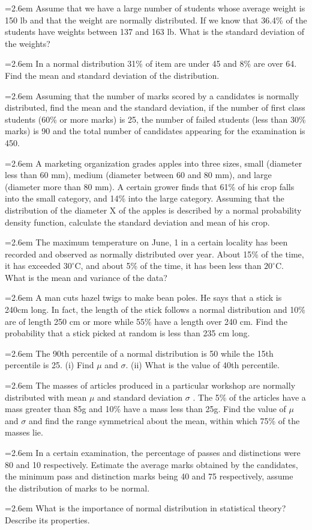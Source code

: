 \documentclass[11pt,a4paper]{article}
\newcommand{\Q}[2]{\par\smallskip\noindent\hangindent=2.6em\hangafter=1
  \makebox[2.6em][l]{\textbf{#1.}}#2\par}
\begin{document}
\Q{22}{Assume that we have a large number of students whose average weight is 150 lb and that the weight are normally distributed. If we know that 36.4\% of the students have weights between 137 and 163 lb. What is the standard deviation of the weights?}
\Q{23}{In a normal distribution 31\% of item are under 45 and 8\% are over 64. Find the mean and standard deviation of the distribution.}
\Q{24}{Assuming that the number of marks scored by a candidates is normally distributed, find the mean and the standard deviation, if the number of first class students (60\% or more marks) is 25, the number of failed students (less than 30\% marks) is 90 and the total number of candidates appearing for the examination is 450.}
\Q{25}{A marketing organization grades apples into three sizes, small (diameter less than 60 mm), medium (diameter between 60 and 80 mm), and large (diameter more than 80 mm). A certain grower finds that 61\% of his crop falls into the small category, and 14\% into the large category. Assuming that the distribution of the diameter X of the apples is described by a normal probability density function, calculate the standard deviation and mean of his crop.}
\Q{26}{The maximum temperature on June, 1 in a certain locality has been recorded and observed as normally distributed over year. About 15\% of the time, it has exceeded $30^{\circ}$C, and about 5\% of the time, it has been less than $20^{\circ}$C. What is the mean and variance of the data?}
\Q{27}{A man cuts hazel twigs to make bean poles. He says that a stick is 240cm long. In fact, the length of the stick follows a normal distribution and 10\% are of length 250 cm or more while 55\% have a length over 240 cm. Find the probability that a stick picked at random is less than 235 cm long.}
\Q{28}{The 90th percentile of a normal distribution is 50 while the 15th percentile is 25. (i) Find $\mu$ and $\sigma$. (ii) What is the value of 40th percentile.}
\Q{29}{The masses of articles produced in a particular workshop are normally distributed with mean $\mu$ and standard deviation $\sigma$ . The 5\% of the articles have a mass greater than 85g and 10\% have a mass less than 25g. Find the value of $\mu$ and $\sigma$ and find the range symmetrical about the mean, within which 75\% of the masses lie.}
\Q{30}{In a certain examination, the percentage of passes and distinctions were 80 and 10 respectively. Estimate the average marks obtained by the candidates, the minimum pass and distinction marks being 40 and 75 respectively, assume the distribution of marks to be normal.}
\Q{31}{What is the importance of normal distribution in statistical theory? Describe its properties.}
\end{document}

